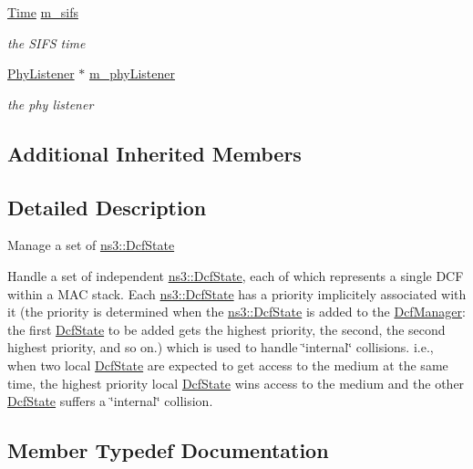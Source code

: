 \begin{DoxyCompactItemize}
\hyperlink{classns3_1_1Time}{Time} \hyperlink{classns3_1_1DcfManager_a1b062fb95502cbd176d76985c8254f35}{m\+\_\+sifs}
\begin{DoxyCompactList}\small\item\em the S\+I\+FS time \end{DoxyCompactList}\item 
\hyperlink{classns3_1_1PhyListener}{Phy\+Listener} $\ast$ \hyperlink{classns3_1_1DcfManager_add2abc731be7ed1df730ba83bd6800ef}{m\+\_\+phy\+Listener}
\begin{DoxyCompactList}\small\item\em the phy listener \end{DoxyCompactList}\end{DoxyCompactItemize}
\subsection*{Additional Inherited Members}


\subsection{Detailed Description}
Manage a set of \hyperlink{classns3_1_1DcfState}{ns3\+::\+Dcf\+State}

Handle a set of independent \hyperlink{classns3_1_1DcfState}{ns3\+::\+Dcf\+State}, each of which represents a single D\+CF within a M\+AC stack. Each \hyperlink{classns3_1_1DcfState}{ns3\+::\+Dcf\+State} has a priority implicitely associated with it (the priority is determined when the \hyperlink{classns3_1_1DcfState}{ns3\+::\+Dcf\+State} is added to the \hyperlink{classns3_1_1DcfManager}{Dcf\+Manager}\+: the first \hyperlink{classns3_1_1DcfState}{Dcf\+State} to be added gets the highest priority, the second, the second highest priority, and so on.) which is used to handle \char`\"{}internal\char`\"{} collisions. i.\+e., when two local \hyperlink{classns3_1_1DcfState}{Dcf\+State} are expected to get access to the medium at the same time, the highest priority local \hyperlink{classns3_1_1DcfState}{Dcf\+State} wins access to the medium and the other \hyperlink{classns3_1_1DcfState}{Dcf\+State} suffers a \char`\"{}internal\char`\"{} collision. 

\subsection{Member Typedef Documentation}
